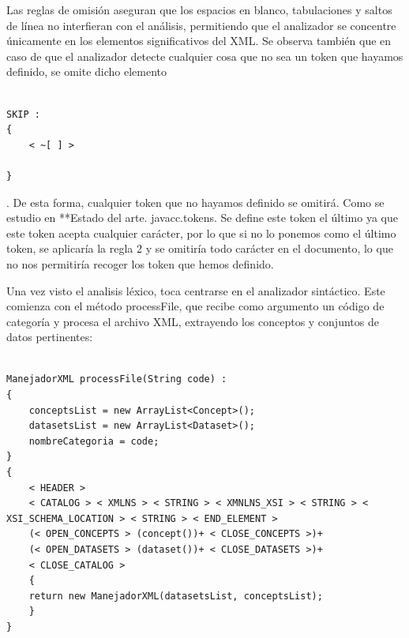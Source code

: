 Las reglas de omisión aseguran que los espacios en blanco, tabulaciones y saltos de línea no interfieran con el análisis, permitiendo que el analizador se concentre únicamente en los elementos significativos del XML. Se observa también que en caso de que el analizador detecte cualquier cosa que no sea un token que hayamos definido, se omite dicho elemento

\lstset{inputencoding=utf8/latin1}
\begin{lstlisting}

SKIP :
{
    < ~[ ] >

}

\end{lstlisting}

. De esta forma, cualquier token que no hayamos definido se omitirá. Como se estudio en **Estado del arte. javacc.tokens. Se define este token el último ya que este token acepta cualquier carácter, por lo que si no lo ponemos como el último token, se aplicaría la regla 2 y se omitiría todo carácter en el documento, lo que no nos permitiría recoger los token que hemos definido.


Una vez visto el analisis léxico, toca centrarse en el analizador sintáctico. Este comienza con el método processFile, que recibe como argumento un código de categoría y procesa el archivo XML, extrayendo los conceptos y conjuntos de datos pertinentes:

\lstset{inputencoding=utf8/latin1}
\begin{lstlisting}

ManejadorXML processFile(String code) :
{
    conceptsList = new ArrayList<Concept>();
    datasetsList = new ArrayList<Dataset>();
    nombreCategoria = code;
}
{
    < HEADER > 
    < CATALOG > < XMLNS > < STRING > < XMNLNS_XSI > < STRING > < XSI_SCHEMA_LOCATION > < STRING > < END_ELEMENT >
    (< OPEN_CONCEPTS > (concept())+ < CLOSE_CONCEPTS >)+
    (< OPEN_DATASETS > (dataset())+ < CLOSE_DATASETS >)+
    < CLOSE_CATALOG >
    {
    return new ManejadorXML(datasetsList, conceptsList);
    }
}
    
\end{lstlisting}

